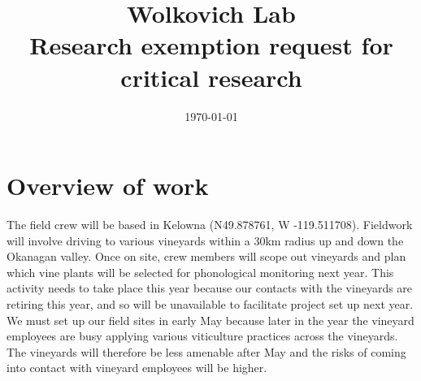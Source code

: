 \documentclass[11pt,letter]{article}
\begin{document}

\renewcommand{\refname}{\CHead{}}

\title{Wolkovich Lab \\ Research exemption request for critical research}
\date{\today}
\maketitle
\tableofcontents


\section{Overview of work}
The field crew will be based in Kelowna (N49.878761, W -119.511708).  Fieldwork will involve driving to various vineyards within a 30km radius up and down the Okanagan valley. Once on site, crew members will scope out vineyards and plan which vine plants will be selected for phonological monitoring next year. This activity needs to take place this year because our contacts with the vineyards are retiring this year, and so will be unavailable to facilitate project set up next year. We must set up our field sites in early May because later in the year the vineyard employees are busy applying various viticulture practices across the vineyards. The vineyards will therefore be less amenable after May and the risks of coming into contact with vineyard employees will be higher.\\
\end{document}
